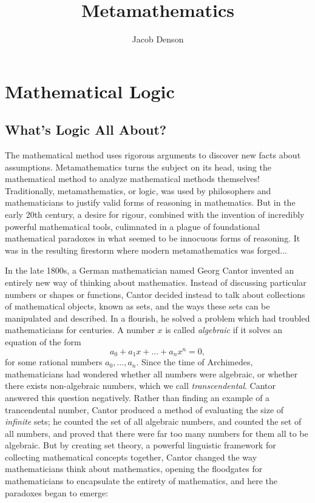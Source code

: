 

\title{Metamathematics}
\author{Jacob Denson}



\maketitle
\tableofcontents

\part{Mathematical Logic}

\chapter{What's Logic All About?}


The mathematical method uses rigorous arguments to discover new facts about assumptions. Metamathematics turns the subject on its head, using the mathematical method to analyze mathematical methods themselves! Traditionally, metamathematics, or logic, was used by philosophers and mathematicians to justify valid forms of reasoning in mathematics. But in the early 20th century, a desire for rigour, combined with the invention of incredibly powerful mathematical tools, culimnated in a plague of foundational mathematical paradoxes in what seemed to be innocuous forms of reasoning. It was in the resulting firestorm where modern metamathematics was forged...

In the late 1800s, a German mathematician named Georg Cantor invented an entirely new way of thinking about mathematics. Instead of discussing particular numbers or shapes or functions, Cantor decided instead to talk about collections of mathematical objects, known as sets, and the ways these sets can be manipulated and described. In a flourish, he solved a problem which had troubled mathematicians for centuries. A number $x$ is called {\it algebraic} if it solves an equation of the form
%
\[ a_0 + a_1 x + \dots + a_n x^n = 0, \]
%
for some rational numbers $a_0, \dots, a_n$. Since the time of Archimedes, mathematicians had wondered whether all numbers were algebraic, or whether there exists non-algebraic numbers, which we call \emph{transcendental}. Cantor answered this question negatively. Rather than finding an example of a trancendental number, Cantor produced a method of evaluating the size of \emph{infinite} sets; he counted the set of all algebraic numbers, and counted the set of all numbers, and proved that there were far too many numbers for them all to be algebraic. But by creating set theory, a powerful linguistic framework for collecting mathematical concepts together, Cantor changed the way mathematicians think about mathematics, opening the floodgates for mathematicians to encapsulate the entirety of mathematics, and here the paradoxes began to emerge:

